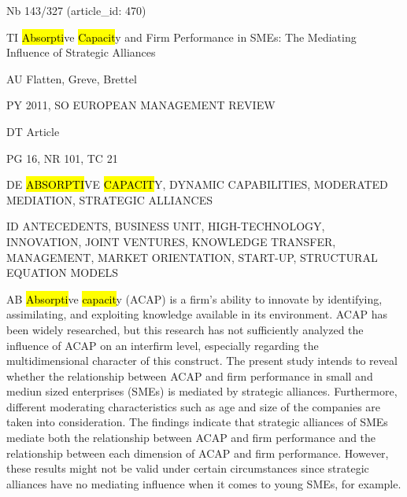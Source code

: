 \documentclass[a4paper]{article}
\begin{document}
\vspace*{-2cm}
Nb \tabto{0cm}143/327 (article\_id: 470)\par
TI \tabto{0cm}\hl{Absorpti}ve \hl{Capacit}y and Firm Performance in SMEs: The Mediating Influence of Strategic Alliances\par
AU \tabto{0cm}Flatten, Greve, Brettel\par
PY \tabto{0cm}2011, SO EUROPEAN MANAGEMENT REVIEW\par
DT \tabto{0cm}Article\par
PG \tabto{0cm}16, NR 101, TC 21\par
DE \tabto{0cm}\hl{ABSORPTI}VE \hl{CAPACIT}Y, DYNAMIC CAPABILITIES, MODERATED MEDIATION, STRATEGIC ALLIANCES\par
ID \tabto{0cm}ANTECEDENTS, BUSINESS UNIT, HIGH-TECHNOLOGY, INNOVATION, JOINT VENTURES, KNOWLEDGE TRANSFER, MANAGEMENT, MARKET ORIENTATION, START-UP, STRUCTURAL EQUATION MODELS\par
AB \tabto{0cm}\hl{Absorpti}ve \hl{capacit}y (ACAP) is a firm's ability to innovate by identifying, assimilating, and exploiting knowledge available in its environment. ACAP has been widely researched, but this research has not sufficiently analyzed the influence of ACAP on an interfirm level, especially regarding the multidimensional character of this construct. The present study intends to reveal whether the relationship between ACAP and firm performance in small and mediun sized enterprises (SMEs) is mediated by strategic alliances. Furthermore, different moderating characteristics such as age and size of the companies are taken into consideration. The findings indicate that strategic alliances of SMEs mediate both the relationship between ACAP and firm performance and the relationship between each dimension of ACAP and firm performance. However, these results might not be valid under certain circumstances since strategic alliances have no mediating influence when it comes to young SMEs, for example.\par
\clearpage
\end{document}
